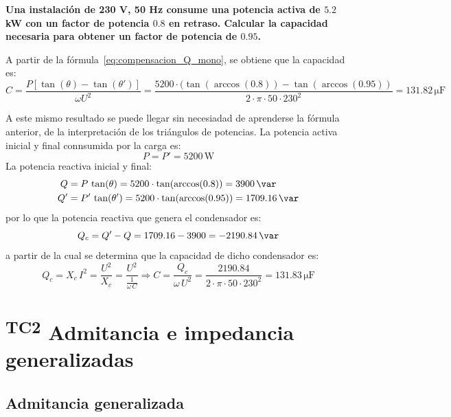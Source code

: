 \begin{example}\label{ex.condensador_Q}
  \textbf{Una instalación de 230 V, 50 Hz consume una potencia activa
    de $5.2$ kW con un factor de potencia $0.8$ en retraso. Calcular
    la capacidad necesaria para obtener un factor de potencia de
    $0.95$.}
	    
  A partir de la fórmula~\eqref{eq:compensacion_Q_mono}, se obtiene
  que la capacidad es:
  \begin{equation*}
    C=\frac{P \left[\tan (\theta) - \tan (\theta')\right]}{\omega U^2}=\dfrac{5200\cdot(\tan(\arccos(0.8))-\tan(\arccos(0.95))}{2\cdot\pi\cdot 50\cdot 230^2}=131.82\,\si{\micro\farad}
  \end{equation*}
	    
  A este mismo resultado se puede llegar sin necesiadad de aprenderse
  la fórmula anterior, de la interpretación de los triángulos de
  potencias. La potencia activa inicial y final connsumida por la
  carga es:
  \begin{equation*}
    P=P'=5200\,\si{\watt}
  \end{equation*}
  La potencia reactiva inicial y final:
  \begin{align*}
    Q&=P\,\tan(\theta)=5200\cdot\tan(\arccos(0.8))=3900\,\si{\var}\\
    Q'&=P'\,\tan(\theta')=5200\cdot\tan(\arccos(0.95))=1709.16\,\si{\var}
  \end{align*}
  por lo que la potencia reactiva que genera el condensador es:
  \begin{equation*}
    Q_c=Q'-Q=1709.16-3900=-2190.84\,\si{\var}
  \end{equation*}
  a partir de la cual se determina que la capacidad de dicho
  condensador es:
  \begin{equation*}
    Q_c=X_c\,I^2=\dfrac{U^2}{X_c}=\dfrac{U^2}{\frac{1}{\omega\,C}}\Rightarrow C=\dfrac{Q_c}{\omega\,U^2}=\dfrac{2190.84}{2\cdot\pi\cdot 50\cdot 230^2}=131.83\,\si{\micro\farad}
  \end{equation*}
\end{example}
	
\section{\textsuperscript{TC2} Admitancia e impedancia generalizadas}
\label{sec:admitancia-impedancia-generalizada}

\subsection{Admitancia generalizada}
\label{sec:admitancia-generalizada}


